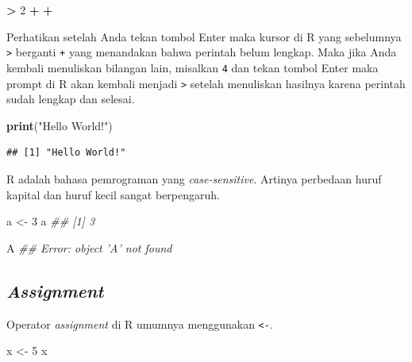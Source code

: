 \documentclass[]{book}
\newenvironment{Shaded}{\begin{snugshade}}{\end{snugshade}}
\newcommand{\CommentTok}[1]{\textcolor[rgb]{0.56,0.35,0.01}{\textit{#1}}}
\newcommand{\DecValTok}[1]{\textcolor[rgb]{0.00,0.00,0.81}{#1}}
\newcommand{\KeywordTok}[1]{\textcolor[rgb]{0.13,0.29,0.53}{\textbf{#1}}}
\newcommand{\NormalTok}[1]{#1}
\newcommand{\OperatorTok}[1]{\textcolor[rgb]{0.81,0.36,0.00}{\textbf{#1}}}
\newcommand{\StringTok}[1]{\textcolor[rgb]{0.31,0.60,0.02}{#1}}
\begin{document}
\begin{Shaded}
\begin{Highlighting}[]
\OperatorTok{>}\StringTok{ }\DecValTok{2} \OperatorTok{+}
\OperatorTok{+}
\end{Highlighting}
\end{Shaded}

Perhatikan setelah Anda tekan tombol Enter maka kursor di R yang sebelumnya \texttt{\textgreater{}} berganti \texttt{+} yang menandakan bahwa perintah belum lengkap. Maka jika Anda kembali menuliskan bilangan lain, misalkan \texttt{4} dan tekan tombol Enter maka prompt di R akan kembali menjadi \texttt{\textgreater{}} setelah menuliskan hasilnya karena perintah sudah lengkap dan selesai.

\begin{Shaded}
\begin{Highlighting}[]
\KeywordTok{print}\NormalTok{(}\StringTok{"Hello World!"}\NormalTok{)}
\end{Highlighting}
\end{Shaded}

\begin{verbatim}
## [1] "Hello World!"
\end{verbatim}

R adalah bahasa pemrograman yang \emph{case-sensitive}. Artinya perbedaan huruf kapital dan huruf kecil sangat berpengaruh.

\begin{Shaded}
\begin{Highlighting}[]
\NormalTok{a <-}\StringTok{ }\DecValTok{3}
\NormalTok{a}
\CommentTok{## [1] 3}
\end{Highlighting}
\end{Shaded}

\begin{Shaded}
\begin{Highlighting}[]
\NormalTok{A}
\CommentTok{## Error: object 'A' not found}
\end{Highlighting}
\end{Shaded}

\hypertarget{assignment}{%
\subsection{\texorpdfstring{\emph{Assignment}}{Assignment}}\label{assignment}}

Operator \emph{assignment} di R umumnya menggunakan \texttt{\textless{}-}.

\begin{Shaded}
\begin{Highlighting}[]
\NormalTok{x <-}\StringTok{ }\DecValTok{5}
\NormalTok{x}
\end{Highlighting}
\end{Shaded}
\end{document}
